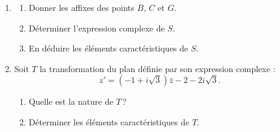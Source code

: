 \begin{description}
		\begin{enumerate}
			\item %
				\begin{enumerate}
					\item Donner les affixes des points $B$, $C$ et $G$.
					\item D\'eterminer l'expression complexe de $S$.
					\item En d\'eduire les \'el\'ements caract\'eristiques de $S$.
				\end{enumerate}
			\item Soit $T$ la transformation du plan d\'efinie par son expression complexe : 
				\[
					z' = (-1 + i \sqrt{3}) \bar{z} - 2 - 2 i \sqrt{3} .
				\]
				\begin{enumerate}
					\item Quelle est la nature de $T$\,?
					\item D\'eterminer les \'el\'ements caract\'eristiques de $T$.
				\end{enumerate}
		\end{enumerate}
\end{description}

